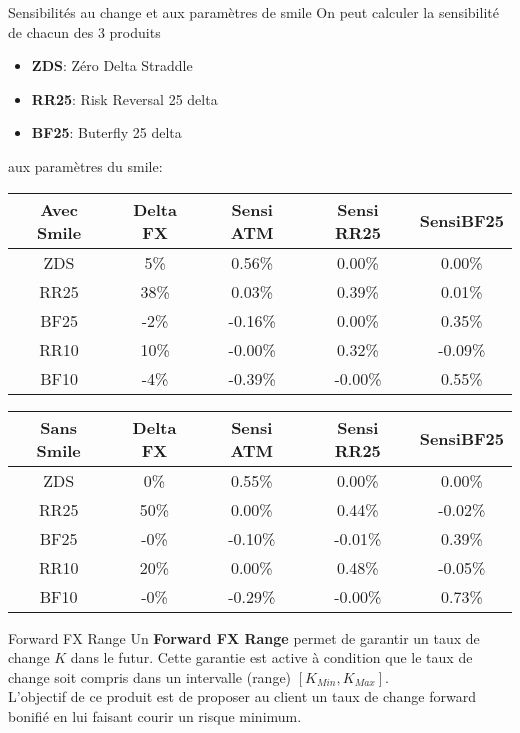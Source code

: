 \documentclass{beamer}
\begin{document}
\begin{frame}{Sensibilités au change et aux paramètres de smile}
On peut calculer la sensibilité de chacun des 3 produits 
\begin{itemize}
\item \textbf{ZDS}: Zéro Delta Straddle
\item \textbf{RR25}: Risk Reversal 25 delta
\item \textbf{BF25}: Buterfly 25 delta
\end{itemize}
aux paramètres du smile:\\
\begin{overprint}
\begin{center}
\begin{tabular}{|c|c|c|c|c|}
\hline
\textbf{Avec Smile}&\textbf{Delta FX}&\textbf{Sensi ATM}&\textbf{Sensi RR25}&\textbf{SensiBF25}\\
\hline
ZDS&5\%&0.56\%&0.00\%&0.00\%\\
RR25&38\%&0.03\%&0.39\%&0.01\%\\
BF25&-2\%&-0.16\%&0.00\%&0.35\%\\
RR10&10\%&-0.00\%&0.32\%&-0.09\%\\
BF10&-4\%&-0.39\%&-0.00\%&0.55\%\\
\hline
\end{tabular}
\end{center}
\begin{center}
\begin{tabular}{|c|c|c|c|c|}
\hline
\textbf{Sans Smile}&\textbf{Delta FX}&\textbf{Sensi ATM}&\textbf{Sensi RR25}&\textbf{SensiBF25}\\
\hline
ZDS&0\%&0.55\%&0.00\%&0.00\%\\
RR25&50\%&0.00\%&0.44\%&-0.02\%\\
BF25&-0\%&-0.10\%&-0.01\%&0.39\%\\
RR10&20\%&0.00\%&0.48\%&-0.05\%\\
BF10&-0\%&-0.29\%&-0.00\%&0.73\%\\
\hline
\end{tabular}
\end{center}
\end{overprint}
\end{frame}

\begin{frame}{Forward FX Range}
Un \textbf{Forward FX Range} permet de garantir un taux de change $K$ dans le futur. Cette garantie est active à condition que le taux de change soit compris dans un intervalle (range) $[K_{Min},K_{Max}]$.\\
\vspace{0.5 cm}
L'objectif de ce produit est de proposer au client un taux de change forward bonifié en lui faisant courir un risque minimum.
\end{frame}
\end{document}
